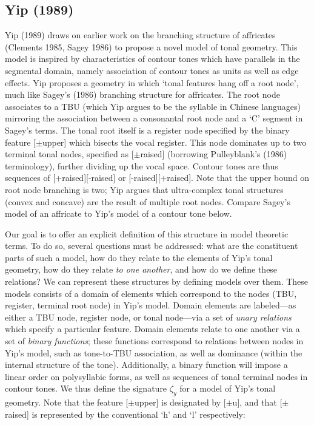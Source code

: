 \documentclass{article}
\begin{document}
\subsection{Yip (1989)}
Yip (1989) draws on earlier work on the branching structure of affricates (Clements 1985, Sagey 1986) to propose a novel model of tonal geometry. This model is inspired by characteristics of contour tones which have parallels in the segmental domain, namely association of contour tones as units as well as edge effects. Yip proposes a geometry in which `tonal features hang off a root node', much like Sagey's (1986) branching structure for affricates. The root node associates to a TBU (which Yip argues to be the syllable in Chinese languages) mirroring the association between a consonantal root node and a `C' segment in Sagey's terms. The tonal root itself is a register node specified by the binary feature [$\pm$upper] which bisects the vocal register. This node dominates up to two terminal tonal nodes, specified as [$\pm$raised] (borrowing Pulleyblank's (1986) terminology), further dividing up the vocal space. Contour tones are thus sequences of [+raised][-raised] or [-raised][+raised]. Note that the upper bound on root node branching is two; Yip argues that ultra-complex tonal structures (convex and concave) are the result of multiple root nodes. Compare Sagey's model of an affricate to Yip's model of a contour tone below.
\begin{center}
\hspace{1cm}
\end{center}
Our goal is to offer an explicit definition of this structure in model theoretic terms. To do so, several questions must be addressed: what are the constituent parts of such a model, how do they relate to the elements of Yip's tonal geometry, how do they relate \emph{to one another}, and how do we define these relations? We can represent these structures by defining models over them. These models consists of a domain of elements which correspond to the nodes (TBU, register, terminal root node) in Yip's model. Domain elements are labeled---as either a TBU node, register node, or tonal node---via a set of \emph{unary relations} which specify a particular feature. Domain elements relate to one another via a set of \emph{binary functions}; these functions correspond to relations between nodes in Yip's model, such as tone-to-TBU association, as well as dominance (within the internal structure of the tone). Additionally, a binary function will impose a linear order on polysyllabic forms, as well as sequences of tonal terminal nodes in contour tones. We thus define the signature $\zeta_{y}$ for a model of Yip's tonal geometry. Note that the feature [$\pm$upper] is designated by [$\pm $u], and that [$\pm$raised] is represented by the conventional `h' and `l' respectively:
\end{document}
